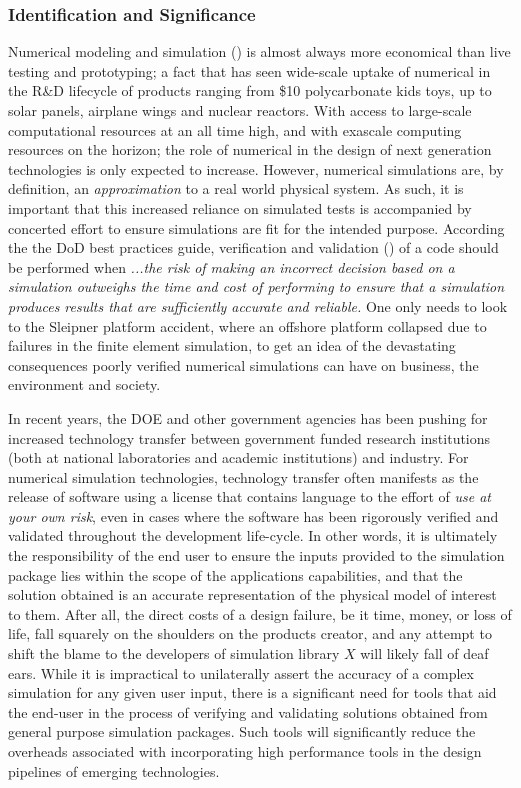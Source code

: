 \subsubsection{Identification and Significance}
\label{intro}
Numerical modeling and simulation (\MS) is almost always more economical than live testing and prototyping; a fact that has seen wide-scale uptake of numerical  \MS in the R\&D lifecycle of products ranging from \$10 polycarbonate kids toys, up to solar panels, airplane wings and nuclear reactors. With access to large-scale computational resources at an all time high, and with exascale computing resources on the horizon; the role of numerical \MS in the design of next generation technologies is only expected to increase. However, numerical simulations are, by definition, an \emph{approximation} to a real world physical system. As such, it is important that this increased reliance on simulated tests is accompanied by concerted effort to ensure simulations are fit for the intended purpose.  According the the DoD best practices guide, verification and validation (\VV) of a code should be performed when  \emph{...the risk of making an incorrect decision based on a simulation outweighs the time and cost of performing \VV to ensure that a simulation produces results that are sufficiently accurate and reliable.} One only needs to look to the Sleipner platform accident, where an offshore platform collapsed due to failures in the finite element simulation, to get an idea of the devastating consequences poorly verified numerical simulations can have on business, the environment and society.

In recent years, the DOE and other government agencies has been pushing for increased technology transfer between government funded research institutions (both at national laboratories and academic institutions) and industry. For numerical simulation technologies, technology transfer often manifests as the release of software using a license that contains language to the effort of \emph{use at your own risk}, even in cases where the software has been rigorously verified and validated throughout the development life-cycle. In other words, it is ultimately the responsibility of the end user to ensure the inputs provided to the simulation package lies within the scope of the applications capabilities, and that the solution obtained is an accurate representation of the physical model of interest to them. After all, the direct costs of a design failure, be it time, money, or loss of life, fall squarely on the shoulders on the products creator, and any attempt to shift the blame to the developers of simulation library $X$ will likely fall of deaf ears. While it is impractical to unilaterally assert the accuracy of a complex simulation for any given user input, there is a significant need for tools that aid the end-user in the process of verifying and validating solutions obtained from general purpose simulation packages.  Such tools will significantly reduce the overheads associated with incorporating high performance \MS tools in the design pipelines of emerging technologies.

